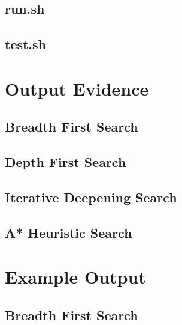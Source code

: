\documentclass[a4paper]{article}
\begin{document}
\begin{appendices}
  \newpage
  \subsection{run.sh}
  \label{app:code-run}
  

  \subsection{test.sh}
  \label{app:code-test}
  

  \newpage
  \section{Output Evidence}
  \subsection{Breadth First Search}
  \label{app:evidence-bfs}
  

  \subsection{Depth First Search}
  \label{app:evidence-dfs}
  

  \newpage
  \subsection{Iterative Deepening Search}
  \label{app:evidence-ids}
  

  \subsection{A* Heuristic Search}
  \label{app:evidence-a*}
  

  \newpage
  \section{Example Output}
  \subsection{Breadth First Search}
  \label{app:example-bfs}
  


\end{appendices}
\end{document}
